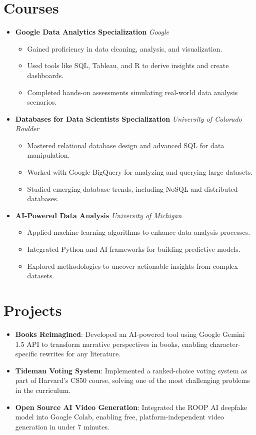 \documentclass[letterpaper,11pt]{article}
\newcommand{\resumeItem}[2]{
  \item\small{
    \textbf{#1}{: #2 \vspace{-2pt}}
  }
}
\newcommand{\resumeSubHeadingListStart}{\begin{itemize}[leftmargin=*]}
\newcommand{\resumeSubHeadingListEnd}{\end{itemize}}
\begin{document}
\section*{Courses}
\begin{itemize}[leftmargin=0.15in]
  \item \textbf{Google Data Analytics Specialization} \hfill \textit{Google}\\
  \begin{itemize}[leftmargin=0.2in]
    \item Gained proficiency in data cleaning, analysis, and visualization.
    \item Used tools like SQL, Tableau, and R to derive insights and create dashboards.
    \item Completed hands-on assessments simulating real-world data analysis scenarios.
  \end{itemize}

  \item \textbf{Databases for Data Scientists Specialization} \hfill \textit{University of Colorado Boulder}\\
  \begin{itemize}[leftmargin=0.2in]
    \item Mastered relational database design and advanced SQL for data manipulation.
    \item Worked with Google BigQuery for analyzing and querying large datasets.
    \item Studied emerging database trends, including NoSQL and distributed databases.
  \end{itemize}

  \item \textbf{AI-Powered Data Analysis} \hfill \textit{University of Michigan}\\
  \begin{itemize}[leftmargin=0.2in]
    \item Applied machine learning algorithms to enhance data analysis processes.
    \item Integrated Python and AI frameworks for building predictive models.
    \item Explored methodologies to uncover actionable insights from complex datasets.
  \end{itemize}
\end{itemize}

\section*{Projects}
\resumeSubHeadingListStart
  \resumeItem{Books Reimagined}{Developed an AI-powered tool using Google Gemini 1.5 API to transform narrative perspectives in books, enabling character-specific rewrites for any literature.}
  \resumeItem{Tideman Voting System}{Implemented a ranked-choice voting system as part of Harvard's CS50 course, solving one of the most challenging problems in the curriculum.}
  \resumeItem{Open Source AI Video Generation}{Integrated the ROOP AI deepfake model into Google Colab, enabling free, platform-independent video generation in under 7 minutes.}
\resumeSubHeadingListEnd
\end{document}

